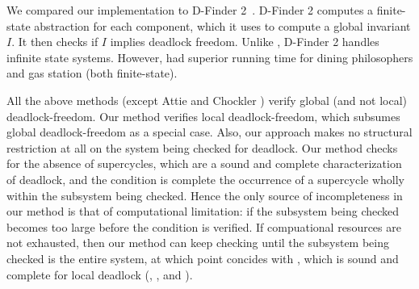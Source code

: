 We compared our implementation \ldfctool to D-Finder 2~\cite{DFinder2}. D-Finder 2
computes a finite-state abstraction for each component, which it uses
to compute a global invariant $I$. It then checks if $I$ 
implies deadlock freedom.  Unlike \ldfctool, D-Finder 2 
handles infinite state systems.
However, \ldfctool had superior running time for
dining philosophers and gas station (both finite-state).


All the above methods (except Attie and Chockler \cite{AC05}) verify global (and not
local) deadlock-freedom.  Our method verifies local deadlock-freedom, which subsumes 
global deadlock-freedom as a special case.
Also, our approach makes no
structural restriction at all on the system being checked for deadlock.  Our method checks
for the absence of supercycles, which are a sound and complete characterization of
deadlock, and the \LAO condition is complete \wrt the occurrence of a supercycle wholly
within the subsystem being checked. 
Hence the only source of incompleteness in our method is that of computational
limitation: if the subsystem being checked becomes too large before 
the \LAO condition is verified. If compuational resources are not exhausted, then our
method can keep checking until the subsystem being checked is the entire system, at which
point \LAO concides with \GAO, which is sound and complete for local deadlock
(, , and ).






